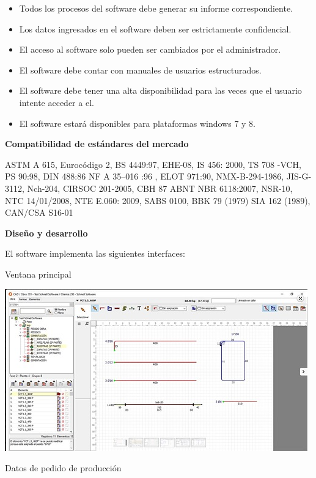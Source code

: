 \documentclass[10pt,a4paper]{article}
\begin{document}
\begin{enumerate}
\begin{itemize}
\item Todos los procesos del software debe generar su informe correspondiente.
\item Los datos ingresados en el software deben ser estrictamente confidencial.
\item El acceso al software solo pueden ser cambiados por el administrador.
\item El software debe contar con manuales de usuarios estructurados.
\item El software debe tener una alta disponibilidad para las veces que el usuario intente acceder a el.
\item El software estará disponibles para plataformas windows 7 y 8.
\end{itemize}

\textbf{Compatibilidad de estándares del mercado}

ASTM A 615, Eurocódigo 2, BS 4449:97, EHE-08, IS 456: 2000, TS 708 -VCH, PS 90:98, DIN 488:86 NF A 35–016 :96 , ELOT 971:90, NMX-B-294-1986, JIS-G-3112, Nch-204, CIRSOC 201-2005, CBH 87 ABNT NBR 6118:2007, NSR-10, NTC 14/01/2008, NTE E.060: 2009, SABS 0100, BBK 79 (1979) SIA 162 (1989), CAN/CSA S16-01

\textbf{Diseño y desarrollo}

El software implementa las siguientes interfaces:

\begin{center}
Ventana principal
\end{center}

\includegraphics[scale=1]{GRAPHICO PRO 1.JPG}

\begin{center}
Datos de pedido de producción
\end{center}


\end{enumerate}
\end{document}
